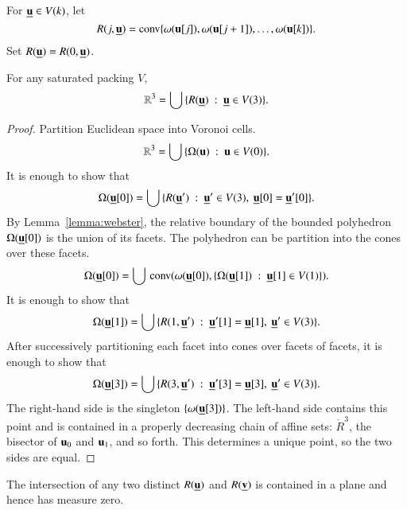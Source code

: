 For ${\underline{{\mathbf u}}}\in V(k)$, let 
\begin{displaymath}R(j,{\underline{{\mathbf u}}}) = {\operatorname{conv}}\{\omega( {\mathbf u}[j]), \omega( {\mathbf u}[j+1]),\ldots,\omega( {\mathbf u}[k])\}.\end{displaymath}  Set $R({\underline{{\mathbf u}}})=R(0,{\underline{{\mathbf u}}})$.
%


\begin{lemma}
For any saturated packing $ V$, 
\begin{displaymath}\mathbb{R}^3 = \bigcup\, \{ R({\underline{{\mathbf u}}}) \ :\  {\underline{{\mathbf u}}}\in  V(3)\}.\end{displaymath}
\end{lemma}

\begin{proof}
Partition Euclidean space into Voronoi cells. 
\begin{displaymath}\mathbb{R}^3 = \bigcup\, \{\Omega( {\mathbf u})\ :\   {\mathbf u}\in  V(0)\}.\end{displaymath}
It is enough to show that
\begin{displaymath}\Omega({\underline{{\mathbf u}}}[0]) = \bigcup\, \{ R({\underline{{\mathbf u}}}') \ :\  {\underline{{\mathbf u}}}'\in  V(3),~{\underline{{\mathbf u}}}[0]={\underline{{\mathbf u}}}'[0]\}.\end{displaymath}
By Lemma~\ref{lemma:webster}, the relative boundary of the bounded polyhedron $\Omega({\underline{{\mathbf u}}}[0])$ is the union of its facets.   The polyhedron can be partition into the cones over these facets.
\begin{displaymath}\Omega({\underline{{\mathbf u}}}[0]) = \bigcup\, {\operatorname{conv}}(\omega({\underline{{\mathbf u}}}[0]),\{\Omega({\underline{{\mathbf u}}}[1])\ :\  {\underline{{\mathbf u}}}[1]\in  V(1)\}).\end{displaymath}
It is enough to show that
\begin{displaymath}\Omega({\underline{{\mathbf u}}}[1]) = \bigcup\, \{ R(1,{\underline{{\mathbf u}}}') \ :\  {\underline{{\mathbf u}}}'[1]={\underline{{\mathbf u}}}[1],~{\underline{{\mathbf u}}}'\in  V(3)\}.\end{displaymath}
After successively partitioning each facet into cones over facets of facets, it is enough to show that
\begin{displaymath}\Omega({\underline{{\mathbf u}}}[3]) = \bigcup\,\{R(3,{\underline{{\mathbf u}}}')\ :\ {\underline{{\mathbf u}}}'[3]={\underline{{\mathbf u}}}[3],~{\underline{{\mathbf u}}}'\in V(3)\}.\end{displaymath}
The right-hand side is the singleton $\{\omega({\underline{{\mathbf u}}}[3])\}$.  The left-hand side
contains this point and is contained in a properly decreasing chain of affine sets:
$\ring{R}^3$, the bisector of $ {\mathbf u}_0$ and $ {\mathbf u}_1$, and so forth.  This determines a unique point,
so the two sides are equal.
\end{proof}

\begin{lemma}  
The intersection of any two distinct $R({\underline{{\mathbf u}}})$ and $R({\underline{{\mathbf v}}})$ is contained in a plane 
and hence has measure zero.
\end{lemma}

